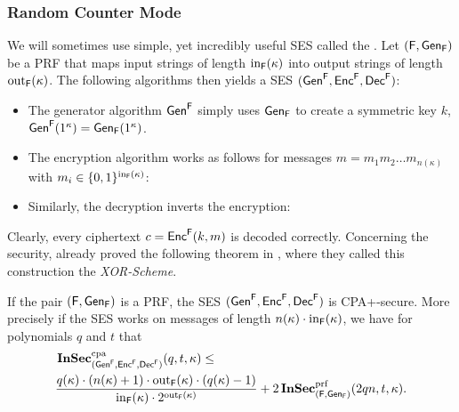 \subsubsection*{Random Counter Mode}
We will sometimes use simple, yet incredibly useful \ac{SES} called the
. Let $(\algf,\Gen_{\algf})$ be a \ac{PRF} that maps
input strings of length $\fin_{\algf}(\kappa)$ into output strings of
length $\fout_{\algf}(\kappa)$. The following algorithms then yields a
\ac{SES} $(\Gen^{\algf},\Enc^{\algf},\Dec^{\algf})$:
\begin{itemize}
\item The generator algorithm $\Gen^{\algf}$ simply uses $\Gen_{\algf}$ to create a
  symmetric key $k$, \ie $\Gen^{\algf}(1^{\kappa})=\Gen_{\algf}(1^{\kappa})$. 
\item The encryption algorithm works as follows for messages
  $m=m_{1}m_{2}\ldots m_{n(\kappa)}$ with $m_{i}\in \{0,1\}^{\fin_{\algf}(\kappa)}$:

\item Similarly, the decryption inverts the encryption:
\end{itemize}

Clearly, every ciphertext $c=\Enc^{\algf}(k,m)$ is decoded correctly. Concerning
the security, \citeauthor{bellare1997concrete} already proved the
following theorem in \cite{bellare1997concrete}, where they called this
construction the \emph{XOR-Scheme}.

\begin{theorem}
\label{thm:counter_mode}
  If the pair $(\algf,\Gen_{\algf})$ is a \acl{PRF}, the \acl{SES}
  $(\Gen^{\algf},\Enc^{\algf},\Dec^{\algf})$ is \ac{CPA+}-secure. More
  precisely if the \ac{SES} works on messages of length $n(\kappa)\cdot
  \fin_{\algf}(\kappa)$, we have for polynomials $q$ and $t$ that
  \begin{align*}
    &\InSec_{(\Gen^{\algf},\Enc^{\algf},\Dec^{\algf})}^{\cpa}(q,t,\kappa)\leq\\
    &\frac{q(\kappa)\cdot (n(\kappa)+1)\cdot \fout_{\algf}(\kappa)\cdot (q(\kappa)-1)}{\fin_{\algf}(\kappa)\cdot 2^{\fout_{\algf}(\kappa)}}+2\InSec^{\prf}_{(\algf,\Gen_{\algf})}(2qn,t,\kappa).
  \end{align*}
\end{theorem}

